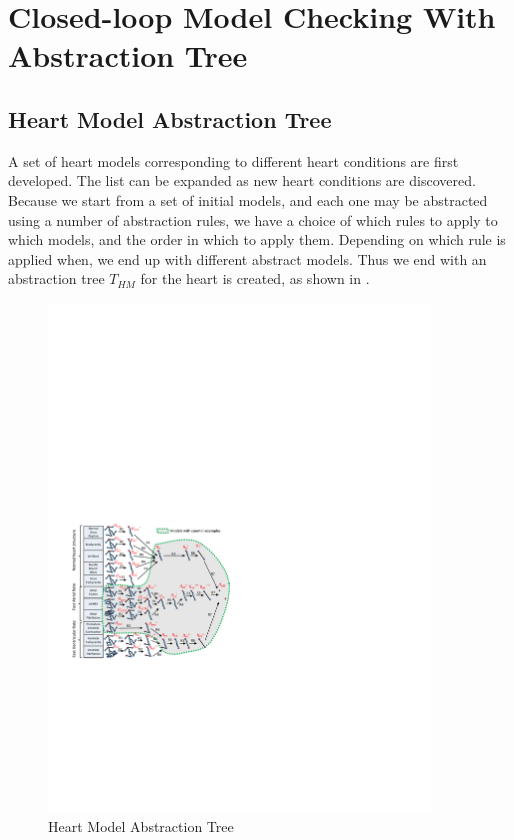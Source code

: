 \section{Closed-loop Model Checking With Abstraction Tree}
\subsection{Heart Model Abstraction Tree}
A set of heart models corresponding to different heart conditions are first developed. 
The list can be expanded as new heart conditions are discovered.
Because we start from a set of initial models, and each one may be abstracted using a number of abstraction rules, we have a choice of which rules to apply to which models, and the order in which to apply them.
Depending on which rule is applied when, we end up with different abstract models.
Thus we end with an abstraction tree $T_{HM}$ for the heart is created, as shown in . 
\begin{figure}[!t]
	\centering
	\includegraphics[width=0.9\textwidth]{figs/abs.pdf}
	\caption{\small Heart Model Abstraction Tree}
	\vspace{-15pt}
	\label{fig:HM_abs}
\end{figure}
